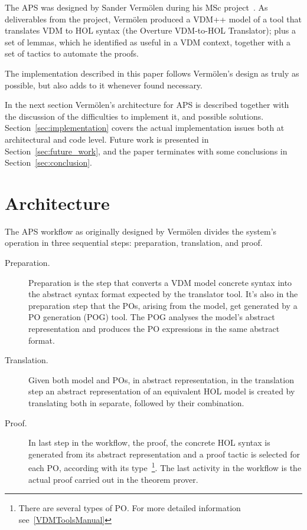 \documentclass[]{article}
\begin{document}
The APS was designed by Sander Verm\"olen during his MSc project~\cite{Sander}.
As deliverables from the project, Verm\"olen produced a VDM++ model of a tool that translates VDM to HOL syntax (the Overture VDM-to-HOL Translator); plus a set of lemmas, which he identified as useful in a VDM context, together with a set of tactics to automate the proofs.

The implementation described in this paper follows Verm\"olen's design as truly as possible, but also adds to it whenever found necessary.

In the next section Verm\"olen's architecture for APS is described together with the discussion of the difficulties to implement it, and possible solutions.
Section~\ref{sec:implementation} covers the actual implementation issues both at architectural and code level.
Future work is presented in Section~\ref{sec:future_work}, and the paper terminates with some conclusions in Section~\ref{sec:conclusion}.




\section{Architecture}
\label{sec:intended_architecure}

%
%

The APS workflow as originally designed by Verm\"olen divides the system's operation in three sequential steps: preparation, translation, and proof.

\begin{description}
  \item[Preparation.] Preparation is the step that converts a VDM model concrete syntax into the abstract syntax format expected by the translator tool.
It's also in the preparation step that the POs, arising from the model, get generated by a PO generation (POG) tool.
The POG analyses the model's abstract representation and produces the PO expressions in the same abstract format.

  \item[Translation.] Given both model and POs, in abstract representation, in the translation step an abstract representation of an equivalent HOL model is created by translating both in separate, followed by their combination.

  \item[Proof.] In last step in the workflow, the proof, the concrete HOL syntax is generated from its abstract representation and a proof tactic is selected for each PO, according with its type~\footnote{There are several types of PO. For more detailed information see~\ref{VDMToolsManual}}. The last activity in the workflow is the actual proof carried out in the theorem prover.
\end{description}
\end{document}
